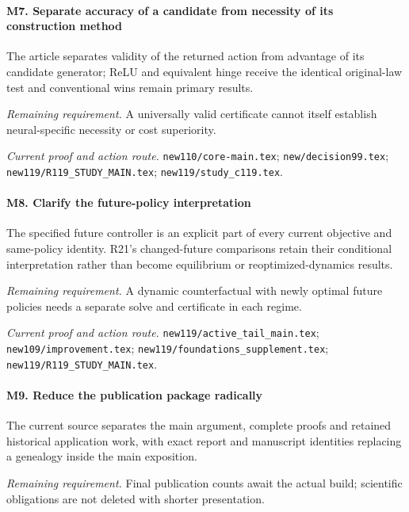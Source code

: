 \paragraph{M7. Separate accuracy of a candidate from necessity of its construction method}

The article separates validity of the returned action from advantage of its candidate generator; ReLU and equivalent hinge receive the identical original-law test and conventional wins remain primary results.

\par\emph{Remaining requirement.} A universally valid certificate cannot itself establish neural-specific necessity or cost superiority.

\par\emph{Current proof and action route.} \nolinkurl{new110/core-main.tex}; \nolinkurl{new/decision99.tex}; \nolinkurl{new119/R119_STUDY_MAIN.tex}; \nolinkurl{new119/study_c119.tex}.

\paragraph{M8. Clarify the future-policy interpretation}

The specified future controller is an explicit part of every current objective and same-policy identity. R21's changed-future comparisons retain their conditional interpretation rather than become equilibrium or reoptimized-dynamics results.

\par\emph{Remaining requirement.} A dynamic counterfactual with newly optimal future policies needs a separate solve and certificate in each regime.

\par\emph{Current proof and action route.} \nolinkurl{new119/active_tail_main.tex}; \nolinkurl{new109/improvement.tex}; \nolinkurl{new119/foundations_supplement.tex}; \nolinkurl{new119/R119_STUDY_MAIN.tex}.

\paragraph{M9. Reduce the publication package radically}

The current source separates the main argument, complete proofs and retained historical application work, with exact report and manuscript identities replacing a genealogy inside the main exposition.

\par\emph{Remaining requirement.} Final publication counts await the actual build; scientific obligations are not deleted with shorter presentation.

